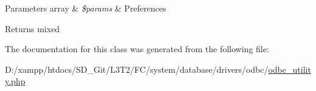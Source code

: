 \begin{DoxyParams}[1]{Parameters}
array & {\em \$params} & Preferences \\
\hline
\end{DoxyParams}
\begin{DoxyReturn}{Returns}
mixed 
\end{DoxyReturn}


The documentation for this class was generated from the following file\+:\begin{DoxyCompactItemize}
\item 
D\+:/xampp/htdocs/\+S\+D\+\_\+\+Git/\+L3\+T2/\+F\+C/system/database/drivers/odbc/\hyperlink{odbc__utility_8php}{odbc\+\_\+utility.\+php}\end{DoxyCompactItemize}
